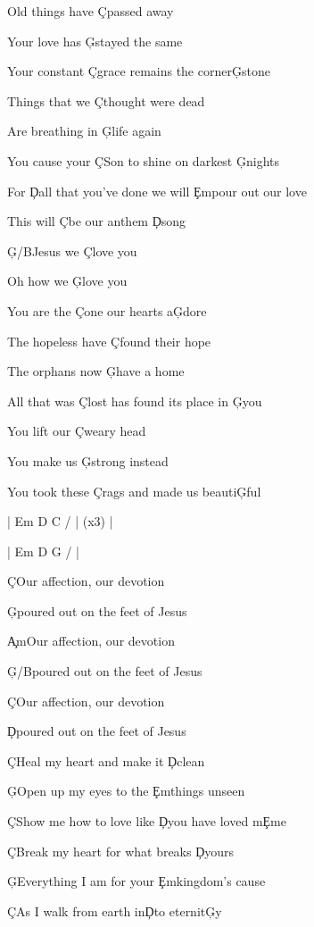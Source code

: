 \documentclass[9pt]{extarticle}
\begin{document}
\bsong

\bv
Old things have \c{C}passed away

Your love has \c{G}stayed the same

Your constant \c{C}grace remains the corner\c{G}stone
\ev

\bv
Things that we \c{C}thought were dead

Are breathing in \c{G}life again

You cause your \c{C}Son to shine on darkest \c{G}nights
\ev

\bp
For \c{D}all that you’ve done we will \c{Em}pour out our love

This will \c{C}be our anthem \c{D}song
\ep

\bc
\c{G/B}Jesus we \c{C}love you

Oh how we \c{G}love you

You are the \c{C}one our hearts a\c{G}dore
\ec

\bv
The hopeless have \c{C}found their hope

The orphans now \c{G}have a home

All that was \c{C}lost has found its place in \c{G}you
\ev

\bv
You lift our \c{C}weary head

You make us \c{G}strong instead

You took these \c{C}rags and made us beauti\c{G}ful
\ev



\bin
|  Em D C /  | (x3) |

|  Em D G /  |
\ein

\bb[2]
\c{C}Our affection, our devotion

\c{G}poured out on the feet of Jesus
\eb

\bb
\c{Am}Our affection, our devotion

\c{G/B}poured out on the feet of Jesus
\eb

\bb
\c{C}Our affection, our devotion

\c{D}poured out on the feet of Jesus
\eb


\bb
\c{C}Heal my heart and make it \c{D}clean

\c{G}Open up my eyes to the \c{Em}things unseen

\c{C}Show me how to love like \c{D}you have loved m\c{Em}e

\c{C}Break my heart for what breaks \c{D}yours

\c{G}Everything I am for your \c{Em}kingdom's cause

\c{C}As I walk from earth in\c{D}to eternit\c{G}y
\eb

\esong
\end{document}

